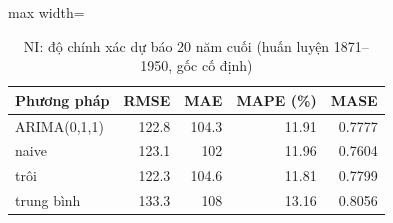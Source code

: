 \begin{table}[H]
\centering\footnotesize
\caption{NI: độ chính xác dự báo 20 năm cuối (huấn luyện 1871--1950, gốc cố định)}\label{tab:tab_b12_11_ni_benchmarks}
\begin{adjustbox}{max width=\linewidth}
\begin{tabular}{|l|r|r|r|r|}
\toprule
Phương pháp & RMSE & MAE & MAPE (\%) & MASE \\
\midrule
ARIMA(0,1,1) & 122.8 & 104.3 & 11.91 & 0.7777 \\
naive & 123.1 & 102 & 11.96 & 0.7604 \\
trôi & 122.3 & 104.6 & 11.81 & 0.7799 \\
trung bình & 133.3 & 108 & 13.16 & 0.8056 \\
\bottomrule
\end{tabular}
\end{adjustbox}
\end{table}
